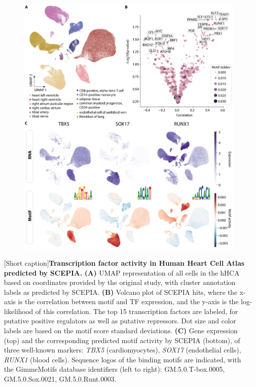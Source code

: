 \begin{figure}[htbp]
    \centering
    \includegraphics[width=1.0\linewidth]{ch.scepia/imgs/SCEPIA_allCells_v10_Myriad_Figure3.png}
\end{figure}

\newpage

[Short caption]{\textbf{Transcription factor activity in Human Heart Cell Atlas predicted by SCEPIA.} \textbf{(A)} UMAP representation of all cells in the hHCA based on coordinates provided by the original study\cite{Kanemaru2023}, with cluster annotation labels as predicted by SCEPIA. \textbf{(B)} Volcano plot of SCEPIA hits, where the x-axis is the correlation between motif and TF expression, and the y-axis is the log-likelihood of this correlation. The top 15 transcription factors are labeled, for putative positive regulators as well as putative repressors. Dot size and color labels are based on the motif score standard deviations. \textbf{(C)} Gene expression (top) and the corresponding predicted motif activity by SCEPIA (bottom), of three well-known markers: \textit{TBX5} (cardiomyocytes), \textit{SOX17} (endothelial cells), \textit{RUNX1} (blood cells). Sequence logos of the binding motifs are indicated, with the GimmeMotifs database identifiers (left to right): GM.5.0.T-box.0005, GM.5.0.Sox.0021, GM.5.0.Runt.0003.}    \label{fig:scepia_hhca1}

